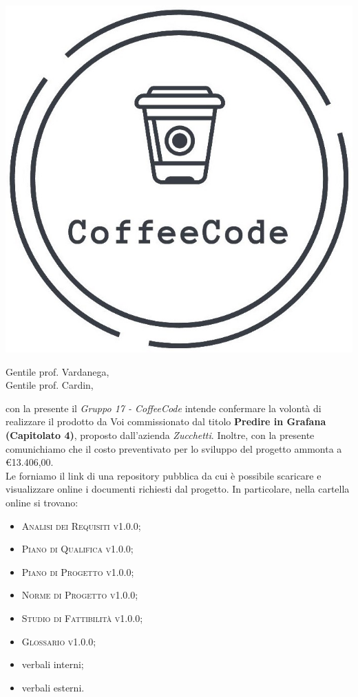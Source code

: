 \documentclass{letter}
\date{13 Aprile 2020}
\begin{document}
\begin{letter}{ }

\includegraphics[scale=0.17]{img/logo.jpg}

\opening{Gentile prof. Vardanega, \\
Gentile prof. Cardin,}

con la presente il \textit{Gruppo 17 - CoffeeCode} intende confermare la volontà di realizzare il prodotto da Voi commissionato dal titolo \textbf{Predire in Grafana (Capitolato 4)}, proposto dall'azienda \textit{Zucchetti}.
Inoltre, con la presente comunichiamo che il costo preventivato per lo sviluppo del progetto ammonta a \euro 13.406,00. \\
Le forniamo il link di una repository pubblica da cui è possibile scaricare e visualizzare online i documenti richiesti dal progetto. In particolare, nella cartella online si trovano:
\begin{itemize}
  \item \textsc{Analisi dei Requisiti v1.0.0};
  \item \textsc{Piano di Qualifica v1.0.0};
  \item \textsc{Piano di Progetto v1.0.0};
  \item \textsc{Norme di Progetto v1.0.0};
  \item \textsc{Studio di Fattibilità v1.0.0};
  \item \textsc{Glossario v1.0.0};
  \item verbali interni;
  \item verbali esterni.
\end{itemize}


\end{letter}
\end{document}
